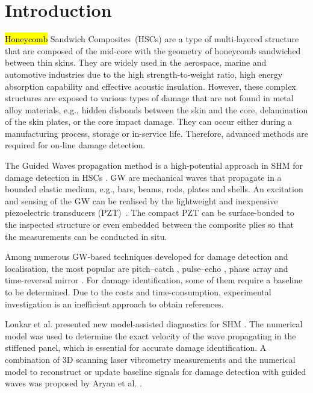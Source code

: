 \documentclass[sensors,article,accept,moreauthors,pdftex]{Definitions/mdpi}
\begin{document}
\section{Introduction}
\label{sec:intro}


\hl{Honeycomb} %
 Sandwich Composites~(HSCs) are a type of multi-layered structure that are composed of the mid-core with the geometry of honeycomb sandwiched between thin skins.
They are widely used in the aerospace, marine and automotive industries due to the high strength-to-weight ratio, high energy absorption capability and effective acoustic insulation.
However, these complex structures are exposed to various types of damage that are not found in metal alloy materials, e.g., hidden disbonds between the skin and the core, delamination of the skin plates, or the core impact damage.
They can occur either during a manufacturing process, storage or in-service life.
Therefore, advanced methods are required for on-line damage detection.

The Guided Waves propagation method is a high-potential approach in SHM for damage detection in  HSCs \cite{mustapha2011assessment, sikdar2016guided, sikdar2016ultrasonic,radzienski2016assessment, yu2019core}.
GW are mechanical waves that propagate in a bounded elastic medium, e.g., bars, beams, rods, plates and shells.
An excitation and sensing of the GW can be realised by the lightweight and inexpensive piezoelectric transducers (PZT)~\cite{giurgiutiumicromechatronics}.
The compact PZT can be surface-bonded to the inspected structure or even embedded between the composite plies so that the measurements can be conducted in situ.


Among numerous GW-based techniques developed for damage detection and localisation, the most popular are pitch--catch \cite{ihn2008pitch, sikdar2017structural}, pulse--echo \cite{guo1993interaction, kudela2008damage}, phase array \cite{lu2006crack, ostachowicz2008elastic} and time-reversal mirror \cite{fink1992time, eremin2016analytically}.
For damage identification, some of them require a baseline to be determined.
Due to the costs and time-consumption, experimental investigation is an inefficient approach to obtain references.

Lonkar et al. presented new model-assisted diagnostics for SHM \cite{lonkar2012model}.
The numerical model was used to determine the exact velocity of the wave propagating in the stiffened panel, which is essential for accurate damage identification.
A combination of 3D scanning laser vibrometry measurements and the numerical model to reconstruct or update baseline signals for damage detection with guided waves was proposed by Aryan et al. \cite{aryan2017formulation}.
\end{document}
